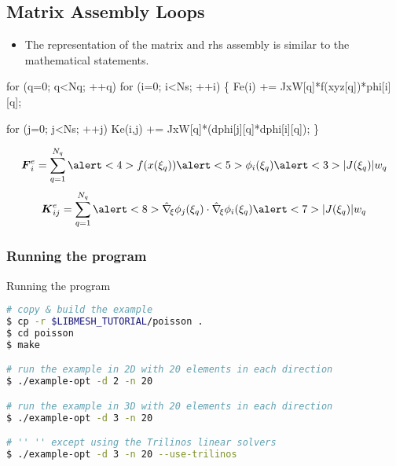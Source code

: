 \subsection*{Matrix Assembly Loops}
\begin{frame}[fragile,t]  
	\begin{block}{}
	  \begin{itemize}    
	  \item{ The \libmesh{} representation of the matrix and
	    rhs assembly is similar to the mathematical statements.
	  }
	  \end{itemize}
	\end{block}
\small
\begin{semiverbatim}
for (q=0; q<Nq; ++q) 
  for (i=0; i<Ns; ++i) \{
    \alert<2>{Fe(i)   += \alert<3>{JxW[q]}*\alert<4>{f(xyz[q])}*\alert<5>{phi[i][q]};}
    
    for (j=0; j<Ns; ++j)
      \alert<6>{Ke(i,j) += \alert<7>{JxW[q]}*(\alert<8>{dphi[j][q]*dphi[i][q]});}
  \}
\end{semiverbatim}
{
  \begin{equation}
    \nonumber
    \bv{F}^e_{i} = 
    \sum_{q=1}^{N_q}
    \alert<4>{f(x(\xi_q))}
    \alert<5>{\phi_i(\xi_q)}
    \alert<3>{|J(\xi_q)| w_q}
  \end{equation}
}
{
  \begin{equation}
  \nonumber
  \bv{K}^e_{ij} =
  \sum_{q=1}^{N_q}
  \alert<8>{
    \hat{\nabla}_{\!\xi} \phi_j(\xi_q) \cdot
    \hat{\nabla}_{\!\xi} \phi_i(\xi_q)
    }
  \alert<7>{|J(\xi_q)| w_q}
  \end{equation}
}
\end{frame}


\begin{frame}[allowframebreaks]
  
\end{frame}
 


\begin{frame}[fragile]
  \frametitle{Running the program}
    \begin{block}{Running the program}
    \begin{lstlisting}[language=bash]
# copy & build the example
$ cp -r $LIBMESH_TUTORIAL/poisson .
$ cd poisson
$ make

# run the example in 2D with 20 elements in each direction
$ ./example-opt -d 2 -n 20 

# run the example in 3D with 20 elements in each direction
$ ./example-opt -d 3 -n 20 

# '' '' except using the Trilinos linear solvers
$ ./example-opt -d 3 -n 20 --use-trilinos
    \end{lstlisting}
  \end{block}
\end{frame}

